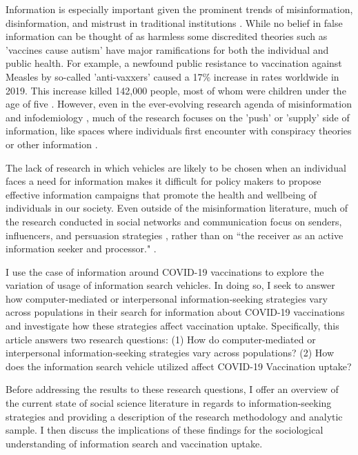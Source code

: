 Information is especially important given the prominent trends of
misinformation, disinformation, and mistrust in traditional institutions
\citep{starbird19, kata10}. While no belief in false information can be thought of as
harmless \citep{douglas21} some discredited theories such as 'vaccines cause autism'
have major ramifications for both the individual and public health.
For example, a newfound public resistance to vaccination
against Measles by so-called 'anti-vaxxers' caused a 17\% increase in rates
worldwide in 2019. This increase killed  142,000 people, most of whom were
children under the age of five \citep{givetash19}. However, even in the ever-evolving
research agenda of misinformation and infodemiology \citep{eysenbach02}, much of the
research focuses on the 'push' or 'supply' side of information, like spaces where
individuals first encounter with conspiracy theories or other information
\citep{johnsonOnlineCompetitionPro2020, broniatowski_etal20}.

The lack of research in which vehicles are likely to be chosen when an
individual faces a need for information makes it difficult for policy makers to
propose effective information campaigns that promote the health and wellbeing of
individuals in our society. Even outside of the misinformation literature, much
of the research conducted in social networks and communication focus on senders,
influencers, and persuasion strategies 
\citep{mertonManifestLatentFunctions1968, katzPersonalInfluencePart1955, lazarsfeldPeopleChoice1944},
rather than on “the receiver as an active information seeker and processor." 
\citep{johnsonComprehensiveModelCancerRelated1993}
\citep[for an exception, see]{eysenbach09}.

I use the case of information around COVID-19 vaccinations to explore the
variation of usage of information search vehicles. In doing so, I seek to answer
how computer-mediated or interpersonal information-seeking strategies vary
across populations in their search for information about COVID-19 vaccinations
and investigate how these strategies affect vaccination uptake. Specifically, this article 
answers two research questions: (1) How do computer-mediated or interpersonal information-seeking
strategies vary across populations? (2) How does the information search vehicle utilized 
affect COVID-19 Vaccination uptake? 

Before addressing the results to these research questions, I offer an overview of the
current state of social science literature in regards to information-seeking
strategies and providing a description of the research methodology and
analytic sample. I then discuss the implications of these findings for the
sociological understanding of information search and vaccination uptake.

